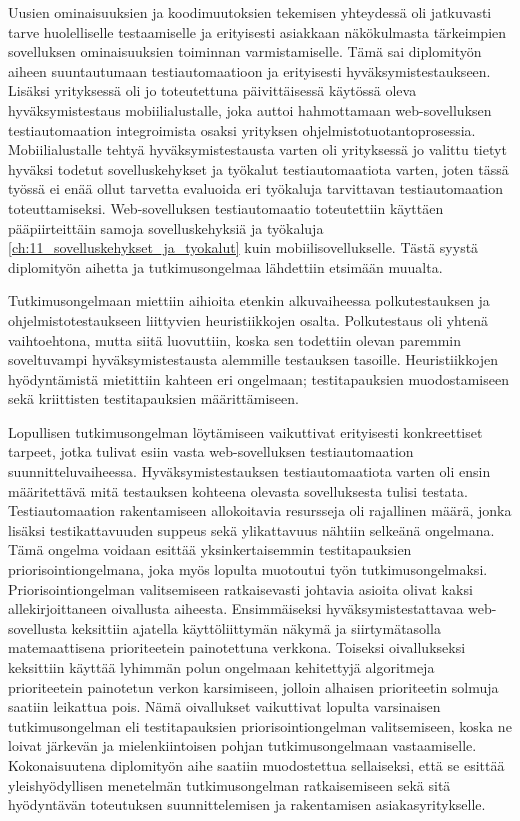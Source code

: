   Uusien ominaisuuksien ja koodimuutoksien tekemisen yhteydessä oli jatkuvasti tarve huolelliselle testaamiselle ja erityisesti asiakkaan näkökulmasta tärkeimpien sovelluksen ominaisuuksien toiminnan varmistamiselle.
  Tämä sai diplomityön aiheen suuntautumaan testiautomaatioon ja erityisesti hyväksymistestaukseen.
  Lisäksi yrityksessä oli jo toteutettuna päivittäisessä käytössä oleva hyväksymistestaus mobiilialustalle, joka auttoi hahmottamaan web-sovelluksen testiautomaation integroimista osaksi yrityksen ohjelmistotuotantoprosessia.
  Mobiilialustalle tehtyä hyväksymistestausta varten oli yrityksessä jo valittu tietyt hyväksi todetut sovelluskehykset ja työkalut testiautomaatiota varten, joten tässä työssä ei enää ollut tarvetta evaluoida eri työkaluja tarvittavan testiautomaation toteuttamiseksi.
  Web-sovelluksen testiautomaatio toteutettiin käyttäen pääpiirteittäin samoja sovelluskehyksiä ja työkaluja \ref{ch:11_sovelluskehykset_ja_tyokalut} kuin mobiilisovellukselle.
  Tästä syystä diplomityön aihetta ja tutkimusongelmaa lähdettiin etsimään muualta.

  Tutkimusongelmaan miettiin aihioita etenkin alkuvaiheessa polkutestauksen ja ohjelmistotestaukseen liittyvien heuristiikkojen osalta.
  Polkutestaus oli yhtenä vaihtoehtona, mutta siitä luovuttiin, koska sen todettiin olevan paremmin soveltuvampi hyväksymistestausta alemmille testauksen tasoille.
  Heuristiikkojen hyödyntämistä mietittiin kahteen eri ongelmaan; testitapauksien muodostamiseen sekä kriittisten testitapauksien määrittämiseen.

  Lopullisen tutkimusongelman löytämiseen vaikuttivat erityisesti konkreettiset tarpeet, jotka tulivat esiin vasta web-sovelluksen testiautomaation suunnitteluvaiheessa.
  Hyväksymistestauksen testiautomaatiota varten oli ensin määritettävä mitä testauksen kohteena olevasta sovelluksesta tulisi testata.
  Testiautomaation rakentamiseen allokoitavia resursseja oli rajallinen määrä, jonka lisäksi testikattavuuden suppeus sekä ylikattavuus nähtiin selkeänä ongelmana.
  Tämä ongelma voidaan esittää yksinkertaisemmin testitapauksien priorisointiongelmana, joka myös lopulta muotoutui työn tutkimusongelmaksi.
  Priorisointiongelman valitsemiseen ratkaisevasti johtavia asioita olivat kaksi allekirjoittaneen oivallusta aiheesta.
  Ensimmäiseksi hyväksymistestattavaa web-sovellusta keksittiin ajatella käyttöliittymän näkymä ja siirtymätasolla matemaattisena prioriteetein painotettuna verkkona.
  Toiseksi oivallukseksi keksittiin käyttää lyhimmän polun ongelmaan kehitettyjä algoritmeja prioriteetein painotetun verkon karsimiseen, jolloin alhaisen prioriteetin solmuja saatiin leikattua pois.
  Nämä oivallukset vaikuttivat lopulta varsinaisen tutkimusongelman eli testitapauksien priorisointiongelman valitsemiseen, koska ne loivat järkevän ja mielenkiintoisen pohjan tutkimusongelmaan vastaamiselle.
  Kokonaisuutena diplomityön aihe saatiin muodostettua sellaiseksi, että se esittää yleishyödyllisen menetelmän tutkimusongelman ratkaisemiseen sekä sitä hyödyntävän toteutuksen suunnittelemisen ja rakentamisen asiakasyritykselle.

